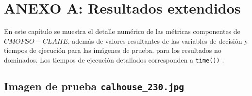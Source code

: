 \renewcommand\thesection{A.\arabic{figure}}
\renewcommand\thefigure{\thesection.\arabic{figure}}
\renewcommand{\thetable}{A.\arabic{table}} 

\chapter*{ANEXO A: Resultados extendidos}
\label{ch:anexo}
\setcounter{figure}{0}
\setcounter{table}{0} 
En este capítulo se muestra el detalle numérico de las métricas componentes de $CMOPSO-CLAHE$. además de valores resultantes de las variables de decisión y tiempos de ejecución para las imágenes de prueba. para los resultados no dominados. Los tiempos de ejecución detallados corresponden a \texttt{time())} \cite{time}.


\section{Imagen de prueba \texttt{calhouse\_230.jpg}}

